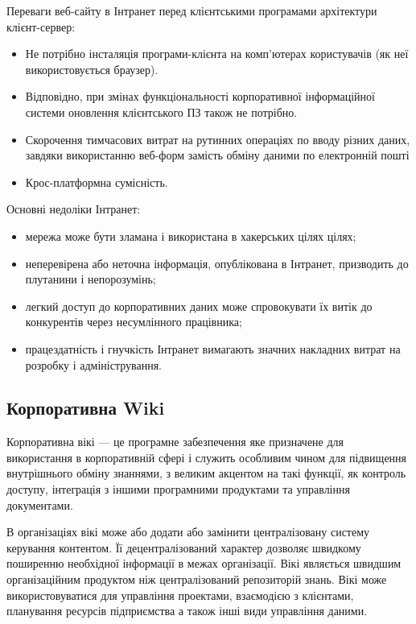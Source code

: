 Переваги веб-сайту в Інтранет перед клієнтськими програмами архітектури клієнт-сервер:
\begin{itemize}
\item Не потрібно інсталяція програми-клієнта на комп'ютерах користувачів (як неї використовується браузер).
\item Відповідно, при змінах функціональності корпоративної інформаційної системи оновлення клієнтського ПЗ також не потрібно.
\item  Скорочення тимчасових витрат на рутинних операціях по вводу різних даних, завдяки використанню веб-форм замість обміну даними по електронній пошті
\item Крос-платформна сумісність.%
\end{itemize}


Основні недоліки Інтранет:
\begin{itemize}
\item мережа може бути зламана і використана в хакерських цілях цілях;
\item неперевірена або неточна інформація, опублікована в Інтранет, призводить до плутанини і непорозумінь;
\item легкий доступ до корпоративних даних може спровокувати їх витік до конкурентів через несумлінного працівника;
\item працездатність і гнучкість Інтранет вимагають значних накладних витрат на розробку і адміністрування.
\end{itemize}








\subsection{Корпоративна Wiki}

Корпоративна вікі --- це програмне забезпечення яке призначене для використання в корпоративній сфері і служить особливим чином для підвищення внутрішнього обміну знаннями, з великим акцентом на такі функції, як контроль доступу, інтеграція з іншими програмними продуктами та управління документами. 
\par В організаціях вікі може або додати або замінити централізовану систему керування контентом. 
Її децентралізований характер дозволяє швидкому поширенню необхідної інформації в межах організації.
Вікі являється швидшим організаційним продуктом ніж централізований репозиторій знань.
Вікі може використовуватися для управління проектами, взаємодією з клієнтами, планування ресурсів підприємства а також інші види управління даними.


